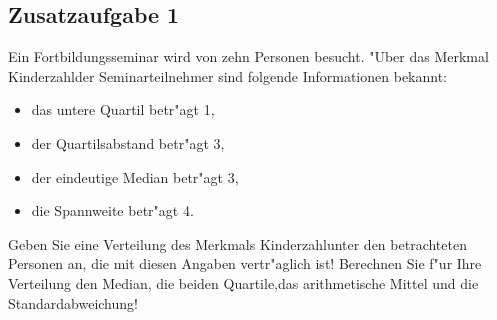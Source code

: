 \subsection*{Zusatzaufgabe 1}

Ein Fortbildungsseminar wird von zehn Personen besucht. "Uber das Merkmal \glqq Kinderzahl\grqq der Seminarteilnehmer sind folgende Informationen bekannt:

\begin{itemize} 
\item das untere Quartil betr"agt 1,
\item der Quartilsabstand betr"agt 3,
\item der eindeutige Median betr"agt 3,
\item die Spannweite betr"agt 4.
\end{itemize}

\noindent Geben Sie eine Verteilung des Merkmals \glqq Kinderzahl\grqq unter den betrachteten Personen an, die mit diesen Angaben vertr"aglich ist! Berechnen Sie f"ur Ihre Verteilung den Median, die beiden Quartile,das arithmetische Mittel und die Standardabweichung!